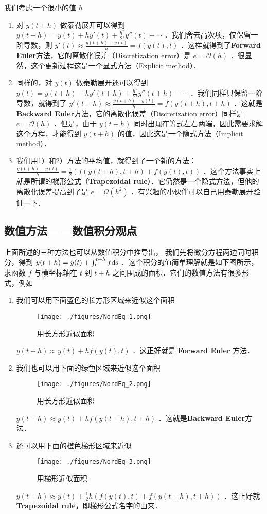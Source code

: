 我们考虑一个很小的值  $h$  
\begin{enumerate}
\item 对  $y(t+h)$  做泰勒展开可以得到  $y(t+h)=y(t)+hy'(t)+\frac{h^2}{2!}y''(t)+\cdots$  ．我们舍去高次项，仅保留一阶导数，则  $y'(t)\approx \frac{y(t+h)-y(t)}{h}= f(y(t),t)$  ．这样就得到了\textbf{Forward Euler}方法，它的离散化误差（Discretization error）是  $e=\mathcal{O}(h)$  ．很显然，这个更新过程这是一个显式方法（Explicit method）．
\item 同样的，对  $y(t)$  做泰勒展开还可以得到  $y(t)=y(t+h)-hy'(t+h)+\frac{h^2}{2!}y''(t+h)-\cdots$  ．我们同样只保留一阶导数，就得到了  $y'(t+h)\approx \frac{y(t+h)-y(t)}{h}= f(y(t+h),t+h)$  ．这就是\textbf{Backward Euler}方法，它的离散化误差（Discretization error）同样是  $e=\mathcal{O}(h)$  ．但是，由于  $y(t+h)$  同时出现在等式左右两端，因此需要求解这个方程，才能得到  $y(t+h)$  的值，因此这是一个隐式方法（Implicit method）．
\item 我们用1）和2）方法的平均值，就得到了一个新的方法：  $ \frac{y(t+h)-y(t)}{h}= \frac{1}{2}\left(f(y(t+h),t+h)+f(y(t),t)\right)$  ．这个方法事实上就是所谓的梯形公式（\textbf{Trapezoidal rule}）．它仍然是一个隐式方法，但他的离散化误差提高到了是  $e=\mathcal{O}(h^2)$ ．有兴趣的小伙伴可以自己用泰勒展开验证一下．
\end{enumerate}


\subsection{数值方法——数值积分观点}

上面所述的三种方法也可以从数值积分中推导出， 我们先将微分方程两边同时积分，得到  $y(t+h)=y(t)+\int_t^{t+h}f \rm{d}s$  ．这个积分的值简单理解就是如下图所示，求函数  $f$  与横坐标轴在  $t$  到  $t+h$  之间围成的面积．它们的数值方法有很多形式，例如

\begin{enumerate}
\item 我们可以用下面蓝色的长方形区域来近似这个面积
\begin{figure}[ht]
\centering
\texttt{[image: ./figures/NordEq\_1.png]}
\caption{用长方形近似面积} \label{NordEq_fig1}
\end{figure}
$y(t+h)\approx y(t)+hf(y(t),t)$  ．这正好就是 \textbf{Forward Euler }方法．
\item 我们也可以用下面的绿色区域来近似这个面积
\begin{figure}[ht]
\centering
\texttt{[image: ./figures/NordEq\_2.png]}
\caption{用长方形近似面积} \label{NordEq_fig2}
\end{figure}
$y(t+h)\approx y(t)+hf(y(t+h),t+h)$  ．这就是\textbf{Backward Euler}方法．
\item 还可以用下面的橙色梯形区域来近似
\begin{figure}[ht]
\centering
\texttt{[image: ./figures/NordEq\_3.png]}
\caption{用梯形近似面积} \label{NordEq_fig3}
\end{figure}
$y(t+h)\approx y(t)+\frac{1}{2}h\left(f(y(t),t)+f(y(t+h),t+h)\right)$  ．这正好就\textbf{Trapezoidal rule，}即梯形公式名字的由来．
\end{enumerate}


